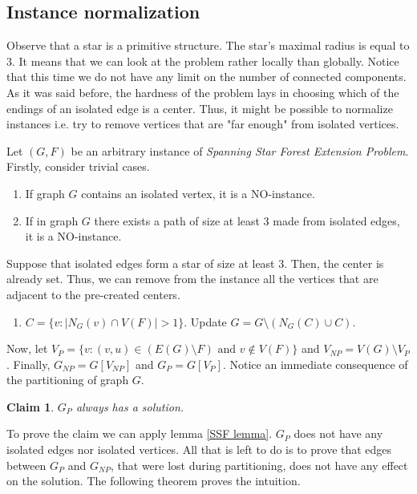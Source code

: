 \documentclass[en]{pracamgr}
\newtheorem{claim}{Claim}
\newcommand{\ssfe}{\emph{Spanning Star Forest Extension Problem}}
\begin{document}
\subsection{Instance normalization} 

Observe that a star is a primitive structure. The star's maximal radius is equal to 3. It means that we can look at the problem rather locally than globally. Notice that this time we do not have any limit on the number of connected components. As it was said before, the hardness of the problem lays in choosing which of the endings of an isolated edge is a center. Thus, it might be possible to normalize instances i.e. try to remove vertices that are "far enough" from isolated vertices.

Let $(G, F)$ be an arbitrary instance of \ssfe{}. Firstly, consider trivial cases.

\begin{enumerate}[leftmargin=*,label=\textbf{Reduction \arabic{enumi}}]
	\item If graph $G$ contains an isolated vertex, it is a NO-instance.
	\item If in graph $G$ there exists a path of size at least 3 made from isolated edges, it is a NO-instance.
\end{enumerate}

Suppose that isolated edges form a star of size at least 3. Then, the center is already set. Thus, we can remove from the instance all the vertices that are adjacent to the pre-created centers.
\begin{enumerate}[leftmargin=*,label=\textbf{Reduction \arabic{enumi}},resume]
	\item $C = \{v: |N_G(v) \cap V(F)| > 1\}$. Update $G= G \setminus (N_G(C) \cup C)$.
\end{enumerate}

Now, let $V_P = \{v: (v,u) \in (E(G) \setminus F) \text{ and } v \notin V(F)\}$ and $V_{NP} = V(G) \setminus V_P$. Finally, $G_{NP} = G[V_{NP}]$ and $G_P = G[V_P]$. Notice an immediate consequence of the partitioning of graph $G$.

\begin{claim}\label{gp cut}
	$G_P$ always has a solution.
\end{claim}

To prove the claim we can apply lemma \ref{SSF lemma}. $G_P$ does not have any isolated edges nor isolated vertices. All that is left to do is to prove that edges between $G_P$ and $G_{NP}$, that were lost during partitioning, does not have any effect on the solution. The following theorem proves the intuition.
\end{document}
